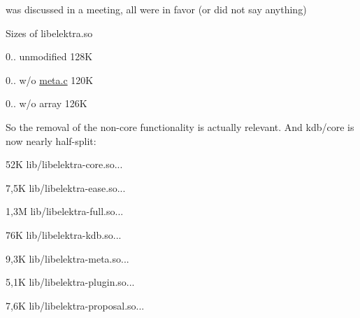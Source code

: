 \begin{DoxyItemize}
\item was discussed in a meeting, all were in favor (or did not say anything)
\end{DoxyItemize}

Sizes of libelektra.\+so


\begin{DoxyItemize}
\item 0.. unmodified 128K
\item 0.. w/o \hyperlink{meta_8c}{meta.\+c} 120K
\item 0.. w/o array 126K
\end{DoxyItemize}

So the removal of the non-\/core functionality is actually relevant. And kdb/core is now nearly half-\/split\+:


\begin{DoxyItemize}
\item 52K lib/libelektra-\/core.\+so...
\item 7,5K lib/libelektra-\/ease.\+so...
\item 1,3M lib/libelektra-\/full.\+so...
\item 76K lib/libelektra-\/kdb.\+so...
\item 9,3K lib/libelektra-\/meta.\+so...
\item 5,1K lib/libelektra-\/plugin.\+so...
\item 7,6K lib/libelektra-\/proposal.\+so... 
\end{DoxyItemize}